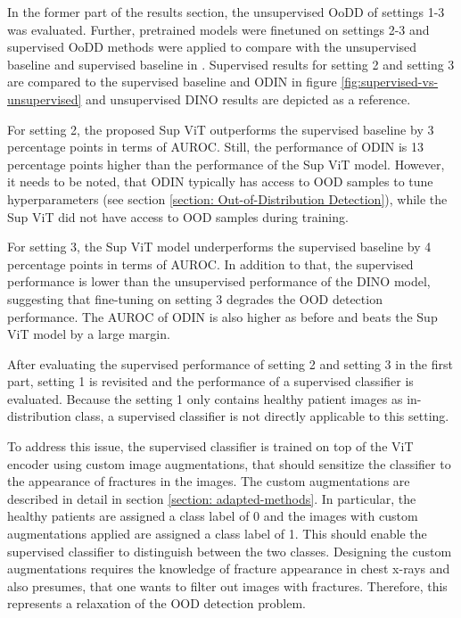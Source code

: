 In the former part of the results section, the unsupervised OoDD of settings 1-3 was evaluated.
Further, pretrained models were finetuned on settings 2-3 and supervised OoDD methods were applied to compare with the unsupervised baseline and supervised baseline in \citep{Berger2021}.
Supervised results for setting 2 and setting 3 are compared to the supervised baseline and ODIN in figure \ref{fig:supervised-vs-unsupervised} and unsupervised DINO results are depicted as a reference.
\par
For setting 2, the proposed Sup ViT outperforms the supervised baseline by 3 percentage points in terms of AUROC.
Still, the performance of ODIN is 13 percentage points higher than the performance of the Sup ViT model.
However, it needs to be noted, that ODIN typically has access to OOD samples to tune hyperparameters (see section \ref{section: Out-of-Distribution Detection}), while the Sup ViT did not have access to OOD samples during training.
\par
For setting 3, the Sup ViT model underperforms the supervised baseline by 4 percentage points in terms of AUROC.
In addition to that, the supervised performance is lower than the unsupervised performance of the DINO model, suggesting that fine-tuning on setting 3 degrades the OOD detection performance.
The AUROC of ODIN is also higher as before and beats the Sup ViT model by a large margin.
\par
After evaluating the supervised performance of setting 2 and setting 3 in the first part, setting 1 is revisited and the performance of a supervised classifier is evaluated.
Because the setting 1 only contains healthy patient images as in-distribution class, a supervised classifier is not directly applicable to this setting.
\par
To address this issue, the supervised classifier is trained on top of the ViT encoder using custom image augmentations, that should sensitize the classifier to the appearance of fractures in the images.
The custom augmentations are described in detail in section \ref{section: adapted-methods}.
In particular, the healthy patients are assigned a class label of 0 and the images with custom augmentations applied are assigned a class label of 1.
This should enable the supervised classifier to distinguish between the two classes.
Designing the custom augmentations requires the knowledge of fracture appearance in chest x-rays and also presumes, that one wants to filter out images with fractures.
Therefore, this represents a relaxation of the OOD detection problem.
